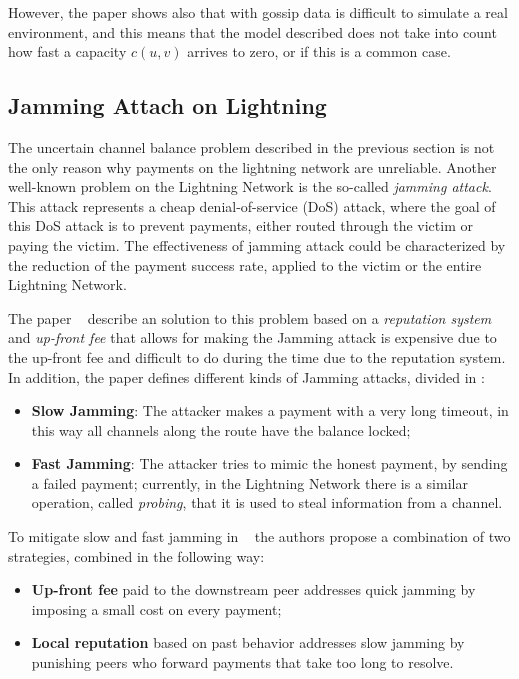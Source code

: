 However, the paper shows also that with gossip data is difficult to simulate 
a real environment, and this means that the model described does not take into 
count  how fast a capacity $c(u, v)$ arrives to zero, or if this is a 
common case.

\subsection{Jamming Attach on Lightning}\label{sec:jamming}

The uncertain channel balance problem described in the previous section 
is not the only reason why payments on the lightning network are unreliable.
Another well-known problem on the Lightning Network is the so-called \emph{jamming attack}. This attack represents a cheap 
denial-of-service (DoS) attack, where the goal of this DoS attack 
is to prevent payments, either routed through the victim or paying the victim. 
The effectiveness of jamming attack could be characterized by the reduction of the
payment success rate, applied to the victim or the entire Lightning Network.

The paper ~\cite{cryptoeprint:2022/1454} describe an solution to this problem 
based on a \emph{reputation system} and \emph{up-front fee} that allows for making
the Jamming attack is expensive due to the up-front fee and difficult to do during the time 
due to the reputation system.
In addition, the paper defines different kinds of Jamming attacks, divided in :

\begin{itemize}
    \item {\bf Slow Jamming}: The attacker makes a payment with a very long timeout, 
        in this way all channels along the route have the balance locked;
    \item {\bf Fast Jamming}: The attacker tries to mimic the honest payment, by sending
        a failed payment; currently, in the Lightning Network there is a similar operation, called \emph{probing},
        that it is used to steal information from a channel.
\end{itemize}

To mitigate slow and fast jamming in ~\cite{cryptoeprint:2022/1454} the authors
propose a combination of two strategies, combined in the following way:

\begin{itemize}
    \item {\bf Up-front fee} paid to the downstream peer addresses quick jamming 
        by imposing a small cost on every payment;
    \item {\bf Local reputation} based on past behavior addresses slow jamming by 
        punishing peers who forward payments that take too long to resolve.
\end{itemize}

